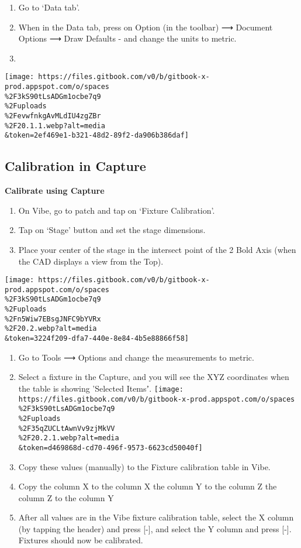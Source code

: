 \documentclass[
]{article}
\begin{document}
\begin{enumerate}
\def\labelenumi{\arabic{enumi}.}
\setcounter{enumi}{4}
\item
  Go to `Data tab'.
\item
  When in the Data tab, press on Option (in the toolbar) ⟶ Document Options ⟶ Draw Defaults - and change the units to metric.
\item
\end{enumerate}

\texttt{[image: https://files.gitbook.com/v0/b/gitbook-x-prod.appspot.com/o/spaces\\\%2F3kS90tLsADGm1ocbe7q9\\\%2Fuploads\\\%2FevwfnkgAvMLdIU4zgZBr\\\%2F20.1.1.webp?alt=media\\\&token=2ef469e1-b321-48d2-89f2-da906b386daf]}

\hypertarget{calibration-in-capture}{%
\subsection{Calibration in Capture}\label{calibration-in-capture}}

\textbf{Calibrate using Capture}

\begin{enumerate}
\def\labelenumi{\arabic{enumi}.}
\item
  On Vibe, go to patch and tap on `Fixture Calibration'.
\item
  Tap on `Stage' button and set the stage dimensions.
\item
  Place your center of the stage in the intersect point of the 2 Bold Axis (when the CAD displays a view from the Top).
\end{enumerate}

\texttt{[image: https://files.gitbook.com/v0/b/gitbook-x-prod.appspot.com/o/spaces\\\%2F3kS90tLsADGm1ocbe7q9\\\%2Fuploads\\\%2Fn5Wiw7EBsgJNFC9bYVRx\\\%2F20.2.webp?alt=media\\\&token=3224f209-dfa7-440e-8e84-4b5e88866f58]}

\begin{enumerate}
\def\labelenumi{\arabic{enumi}.}
\setcounter{enumi}{3}
\item
  Go to Tools ⟶ Options and change the measurements to metric.
\item
  Select a fixture in the Capture, and you will see the XYZ coordinates when the table is showing 'Selected Itemsʼ.
  \texttt{[image: https://files.gitbook.com/v0/b/gitbook-x-prod.appspot.com/o/spaces\\\%2F3kS90tLsADGm1ocbe7q9\\\%2Fuploads\\\%2F35qZUCLtAwnVv9zjMkVV\\\%2F20.2.1.webp?alt=media\\\&token=d469868d-cd70-496f-9573-6623cd50040f]}
\item
  Copy these values (manually) to the Fixture calibration table in Vibe.
\item
  Copy the column X to the column X the column Y to the column Z the column Z to the column Y
\item
  After all values are in the Vibe fixture calibration table, select the X column (by tapping the header) and press {[}-{]}, and select the Y column and press {[}-{]}. Fixtures should now be calibrated.
\end{enumerate}
\end{document}
